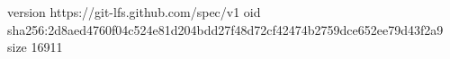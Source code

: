 version https://git-lfs.github.com/spec/v1
oid sha256:2d8aed4760f04c524e81d204bdd27f48d72cf42474b2759dce652ee79d43f2a9
size 16911
